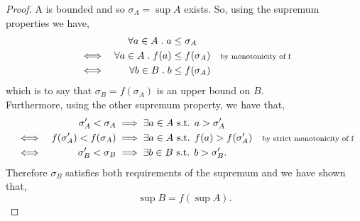 \documentclass[../MathsNotesBase.tex]{subfiles}
\begin{document}
{	
		\bigskip
		\begin{proof}
			A is bounded and so ${ \sigma_A = \sup A }$ exists. So, using the supremum properties we have,
			\begin{align*}
			&& \forall a \in A \;.\; a &\leq \sigma_A  \\
			&\iff & \forall a \in A \;.\; f(a)  &\leq f(\sigma_A)  &\text{\scriptsize{by monotonicity of f}}\\
			&\iff & \forall b \in B \;.\; b  &\leq f(\sigma_A) 
			\end{align*}
			which is to say that $\sigma_B = f(\sigma_A)$ is an upper bound on $B$.\\
			Furthermore, using the other supremum property, we have that,
			\begin{align*}
			&& \sigma_A' < \sigma_A &\implies \exists a \in A \text{ s.t. } a > \sigma_A' \\
			&\iff & f(\sigma_A') < f(\sigma_A)  &\implies \exists a \in A \text{ s.t. } f(a) > f(\sigma_A')  &\text{\scriptsize{by strict monotonicity of f}}\\
			&\iff & \sigma_B' < \sigma_B  &\implies \exists b \in B \text{ s.t. } b > \sigma_B'.	
			\end{align*}
			Therefore $\sigma_B$ satisfies both requirements of the supremum and we have shown that,
			\[ \sup B = f(\sup A). \]
		\end{proof}
	}
	
	
	\pagebreak
	
\end{document}
